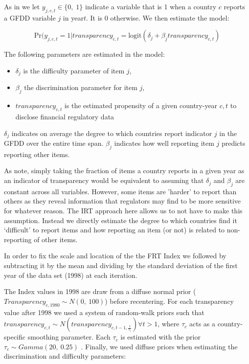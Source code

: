 \documentclass[a4paper]{article}
\begin{document}
As in \cite{Hollyer2014} we let $y_{j,c,t} \in \{0,\; 1\}$ indicate a variable that is 1 when a country $c$ reports a GFDD variable $j$ in year$t$. It is 0 otherwise. We then estimate the model:

\begin{equation}
    \mathrm{Pr}(y_{j,c,t} = 1|transparency_{c,t} = \mathrm{logit}(\delta_{j} + \beta_{j}transparency_{c,t})
\end{equation}

The following parameters are estimated in the model:

\begin{itemize}
    \item $\delta_{j}$ is the difficulty parameter of item $j$,
    \item $\beta_{j}$ the discrimination parameter for item $j$,
    \item $transparency_{c,t}$ is the estimated propensity of a given country-year $c,t$ to disclose financial regulatory data
\end{itemize}

\noindent $\delta_{j}$ indicates on average the degree to which countries report indicator $j$ in the GFDD over the entire time span. $\beta_{j}$ indicates how well reporting item $j$ predicts reporting other items. 

As \cite{Hollyer2014} note, simply taking the fraction of items a country reports in a given year as an indicator of transparency would be equivalent to assuming that $\delta_{j}$ and $\beta_{j}$ are constant across all variables. However, some items are 'harder' to report than others as they reveal information that regulators may find to be more sensitive for whatever reason. The IRT approach here allows us to not have to make this assumption. Instead we directly estimate the degree to which countries find it `difficult' to report items and how reporting an item (or not) is related to non-reporting of other items.

In order to fix the scale and location of the the FRT Index we followed \cite{Hollyer2014} by subtracting it by the mean and dividing by the standard deviation of the first year of the data set (1998) at each iteration. 

The Index values in 1998 are draw from a diffuse normal prior ($Transparency_{c,1980} \sim N(0,\:100)$) before recentering. For each transparency value after 1998 we used a system of random-walk priors such that $transparency_{c,t} \sim N(transparency_{c,t-1,\frac{1}{\tau_{c}}}) \forall t > 1$, where $\tau_{c}$ acts as a country-specific smoothing parameter. Each $\tau_{c}$ is estimated with the prior $\tau_{c} \sim Gamma(20,\:0.25)$ \citep[for more details see][8]{Jackman2009,Hollyer2014}. Finally, we used diffuse priors when estimating the discrimination and difficulty parameters:
\end{document}

